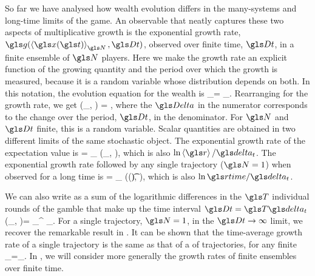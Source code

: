 
So far we have analysed how wealth evolution differs in the many-systems and long-time limits of the game. An observable that neatly captures these two aspects of multiplicative growth is the exponential growth rate, $\g(\ave{\x(\t)}_\N, \Dt)$, observed over finite time, $\Dt$, in a finite ensemble of $\N$ players. Here we make the growth rate an explicit function of the growing quantity and the period over which the growth is measured, because it is a random variable whose distribution depends on both. In this notation, the evolution equation for the \FEA wealth is
\be
\ave{\x(\t+\Dt)}_\N = \ave{\x(\t)}_\N \exp \left[ \g(\ave{\x(\t)}_\N, \Dt) \Dt \right].
\ee
Rearranging for the growth rate, we get
\be
\g(\ave{\x(\t)}_\N, \Dt) = \frac{\D \ln \ave{\x}_\N}{\Dt},
\ee
where the $\D$ in the numerator corresponds to the change over the period, $\Dt$, in the denominator. For $\N$ and $\Dt$ finite, this is a random variable. Scalar quantities are obtained in two different limits of the same stochastic object. The exponential growth rate of the expectation value is
\be
\ggave = \lim_{\N\to\infty} \g(\ave{\x(\t)}_\N, \Dt),
\ee
which is also $\ln \ave{\gr}/\dt$. The exponential growth rate followed by any single trajectory ($\N=1$) when observed for a long time is 
\be
\ggtime = \lim_{\Dt\to\infty} \g(\x(\t), \Dt),
\ee
which is also $\ln \grtime/\dt$.

We can also write  as a sum of the logarithmic differences in the $\T$ individual rounds of the gamble that make up the time interval $\Dt=\T \dt$
\be
\g(\ave{\x(\t)}_\N, \Dt)=  \sum_{}^{\T} \D\ln \ave{\x(\t+\gtau\dt)}_\N.
\ee
For a single trajectory, $\N=1$, in the $\Dt\to\infty$ limit, we recover the remarkable result in .
It can be shown \cite{PetersKlein2013} that the time-average growth rate of a single trajectory is the same as that of a \FEA of trajectories, \ie for any finite \N 
\be
\lim_{\Dt\to\infty}\frac{\D \ln \x}{\Dt}=\lim_{\Dt\to\infty}.
\ee
In , we will consider more generally the growth rates of finite ensembles over finite time.


